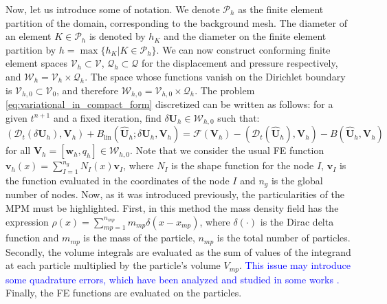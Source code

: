 \documentclass[11pt,english]{article}
\newcommand{\LM}[1]{\textcolor{blue}{#1}}
\def\SpaceDisp{\boldsymbol{\mathcal{V}}}
\def\SpacePress{\mathcal{Q}}
\def\SpaceTotal{\boldsymbol{\mathcal{W}}}
\def\TestFunctions{\boldsymbol{V}}
\def\UnkVariables{\boldsymbol{U}}
\def\DerB{B_{\text{lin}}}
\def\mp{\textit{mp}}
\begin{document}
    Now, let us introduce some of notation. We denote $\mathcal{P}_h$ as the finite element partition of the domain, corresponding to the background mesh. The diameter of an element $K\in\mathcal{P}_h$ is denoted by $h_K$ and the diameter on the finite element partition by $h=\max\{h_K|K\in\mathcal{P}_h\}$. We can now construct conforming finite element spaces $\SpaceDisp_h \subset \SpaceDisp$,  $\SpacePress_h \subset \SpacePress$ for the displacement and pressure respectively, and $\SpaceTotal_h=\SpaceDisp_h \times \SpacePress_h$.  The space whose functions vanish on the Dirichlet boundary is $\SpaceDisp_{h,0} \subset \SpaceDisp_0$, and therefore $\SpaceTotal_{h,0}=\SpaceDisp_{h,0} \times \SpacePress_h$. The problem \eqref{eq:variational_in_compact_form} discretized can be written as follows: for a given $t^{n+1}$ and a fixed iteration, find $\delta \UnkVariables_h \in \SpaceTotal_{h,0}$ such that:
     \begin{equation}
        \left(\mathcal{D}_t\left( \delta \UnkVariables_h \right),\TestFunctions_h \right) + \DerB (\hat{\UnkVariables}_h;\delta \UnkVariables_h,\TestFunctions_h) = \mathcal{F}\left(\TestFunctions_h\right)-(\mathcal{D}_t(\hat{\UnkVariables}_h),\TestFunctions_h) -B(\hat{\UnkVariables}_h,\TestFunctions_h)     \label{eq:galerkin_in_compact_form}
    \end{equation}
     for all $\TestFunctions_h = [\boldsymbol{w}_h, q_h] \in \SpaceTotal_{h,0}$. Note that we consider the usual FE function $\boldsymbol{v}_h(x)=\sum^{n_g}_{I=1}N_I(x) \boldsymbol{v}_I$, where $N_I$ is the shape function for the node $I$, $\boldsymbol{v}_I$ is the function evaluated in the coordinates of the node $I$ and $n_g$ is the global number of nodes.     
Now, as it was introduced previously, the particularities of the MPM must be highlighted. 
First, in this method the mass density field has the expression $\rho(x)=\sum^{n_{\mp}}_{ \mp=1} m_{\mp}\delta(x-x_{\mp})$, where $\delta(\cdot)$ is the Dirac delta function and $m_{\mp}$ is the mass of the particle, $n_{\mp}$ is the total number of particles. Secondly, the volume integrals are evaluated as the sum of values of the integrand at each particle multiplied by the particle's volume $V_{\mp}$. \LM{This issue may introduce some quadrature errors, which have been analyzed and studied in some works \cite{steffen2008analysis}.}
Finally, the FE functions are evaluated on the particles.  
\end{document}
